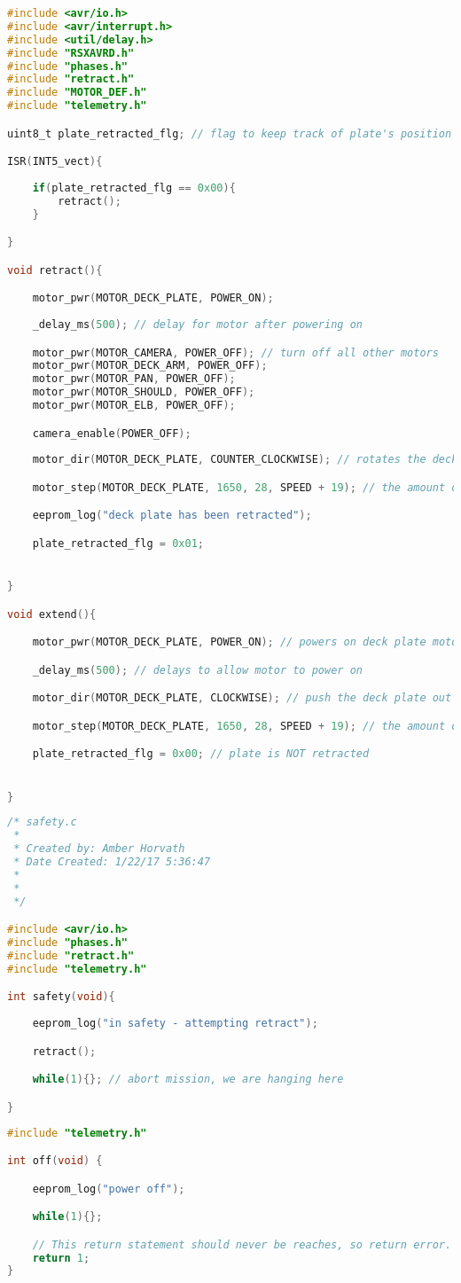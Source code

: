 \begin{lstlisting}[language=C]
#include <avr/io.h>
#include <avr/interrupt.h>
#include <util/delay.h>
#include "RSXAVRD.h"
#include "phases.h"
#include "retract.h"
#include "MOTOR_DEF.h"
#include "telemetry.h"

uint8_t plate_retracted_flg; // flag to keep track of plate's position

ISR(INT5_vect){
	
	if(plate_retracted_flg == 0x00){
		retract();
	}

}

void retract(){ 

	motor_pwr(MOTOR_DECK_PLATE, POWER_ON);
	
	_delay_ms(500); // delay for motor after powering on

	motor_pwr(MOTOR_CAMERA, POWER_OFF); // turn off all other motors
	motor_pwr(MOTOR_DECK_ARM, POWER_OFF);
	motor_pwr(MOTOR_PAN, POWER_OFF);
	motor_pwr(MOTOR_SHOULD, POWER_OFF);
	motor_pwr(MOTOR_ELB, POWER_OFF);

	camera_enable(POWER_OFF); 
	
	motor_dir(MOTOR_DECK_PLATE, COUNTER_CLOCKWISE); // rotates the deck plate to 

	motor_step(MOTOR_DECK_PLATE, 1650, 28, SPEED + 19); // the amount of steps needed to pull the arm back in

	eeprom_log("deck plate has been retracted");

	plate_retracted_flg = 0x01;


}

void extend(){

	motor_pwr(MOTOR_DECK_PLATE, POWER_ON); // powers on deck plate motor

	_delay_ms(500); // delays to allow motor to power on

	motor_dir(MOTOR_DECK_PLATE, CLOCKWISE); // push the deck plate out

	motor_step(MOTOR_DECK_PLATE, 1650, 28, SPEED + 19); // the amount of steps needed to move the deck plate at a good speed

	plate_retracted_flg = 0x00; // plate is NOT retracted


}
\end{lstlisting}

\begin{lstlisting}[language=C]
/* safety.c
 * 
 * Created by: Amber Horvath
 * Date Created: 1/22/17 5:36:47
 *
 *
 */

#include <avr/io.h>
#include "phases.h"
#include "retract.h"
#include "telemetry.h"

int safety(void){
    
	eeprom_log("in safety - attempting retract");

    retract();

    while(1){}; // abort mission, we are hanging here

}
\end{lstlisting}

\begin{lstlisting}[language=C]
#include "telemetry.h"

int off(void) {

	eeprom_log("power off");

	while(1){};

	// This return statement should never be reaches, so return error.
	return 1;
}
\end{lstlisting}
